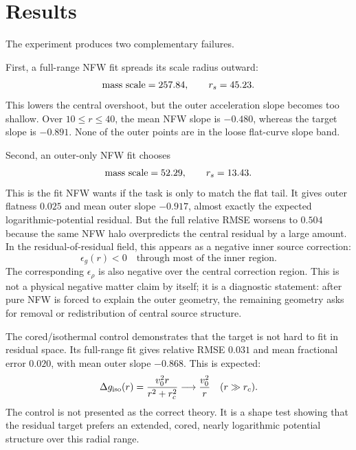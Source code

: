 \documentclass[10pt]{article}
\begin{document}
\section{Results}

The experiment produces two complementary failures.

First, a full-range NFW fit spreads its scale radius outward:
\begin{equation}
{\rm mass\ scale}=257.84,
\qquad
r_s=45.23.
\end{equation}
This lowers the central overshoot, but the outer acceleration slope becomes too
shallow. Over $10\le r\le 40$, the mean NFW slope is $-0.480$, whereas the
target slope is $-0.891$. None of the outer points are in the loose flat-curve
slope band.

Second, an outer-only NFW fit chooses
\begin{equation}
{\rm mass\ scale}=52.29,
\qquad
r_s=13.43.
\end{equation}
This is the fit NFW wants if the task is only to match the flat tail. It gives
outer flatness $0.025$ and mean outer slope $-0.917$, almost exactly the
expected logarithmic-potential residual. But the full relative RMSE worsens to
$0.504$ because the same NFW halo overpredicts the central residual by a large
amount. In the residual-of-residual field, this appears as a negative inner
source correction:
\begin{equation}
\epsilon_g(r)<0
\quad
\text{through most of the inner region.}
\end{equation}
The corresponding $\epsilon_\rho$ is also negative over the central correction
region. This is not a physical negative matter claim by itself; it is a
diagnostic statement: after pure NFW is forced to explain the outer geometry,
the remaining geometry asks for removal or redistribution of central source
structure.

The cored/isothermal control demonstrates that the target is not hard to fit in
residual space. Its full-range fit gives relative RMSE $0.031$ and mean
fractional error $0.020$, with mean outer slope $-0.868$. This is expected:
\begin{equation}
\Delta g_{\rm iso}(r)
=
\frac{v_0^2 r}{r^2+r_c^2}
\longrightarrow
\frac{v_0^2}{r}
\quad
(r\gg r_c).
\end{equation}
The control is not presented as the correct theory. It is a shape test showing
that the residual target prefers an extended, cored, nearly logarithmic
potential structure over this radial range.
\end{document}
